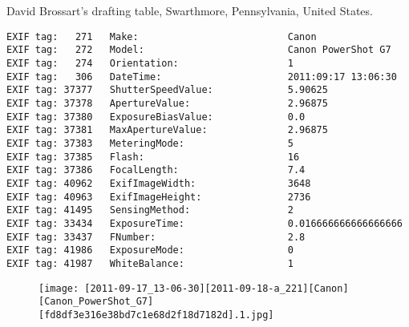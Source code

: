 \section{\protect{}}
\noindent David Brossart's drafting table, Swarthmore, Pennsylvania, United States.
\noindent
\begin{lstlisting}
EXIF tag:   271   Make:                          Canon
EXIF tag:   272   Model:                         Canon PowerShot G7
EXIF tag:   274   Orientation:                   1
EXIF tag:   306   DateTime:                      2011:09:17 13:06:30
EXIF tag: 37377   ShutterSpeedValue:             5.90625
EXIF tag: 37378   ApertureValue:                 2.96875
EXIF tag: 37380   ExposureBiasValue:             0.0
EXIF tag: 37381   MaxApertureValue:              2.96875
EXIF tag: 37383   MeteringMode:                  5
EXIF tag: 37385   Flash:                         16
EXIF tag: 37386   FocalLength:                   7.4
EXIF tag: 40962   ExifImageWidth:                3648
EXIF tag: 40963   ExifImageHeight:               2736
EXIF tag: 41495   SensingMethod:                 2
EXIF tag: 33434   ExposureTime:                  0.016666666666666666
EXIF tag: 33437   FNumber:                       2.8
EXIF tag: 41986   ExposureMode:                  0
EXIF tag: 41987   WhiteBalance:                  1

\end{lstlisting}
\clearpage
\begin{figure}
\raggedleft
\texttt{[image: [2011-09-17\_13-06-30][2011-09-18-a\_221][Canon][Canon\_PowerShot\_G7][fd8df3e316e38bd7c1e68d2f18d7182d].1.jpg]}
\end{figure}


\clearpage
